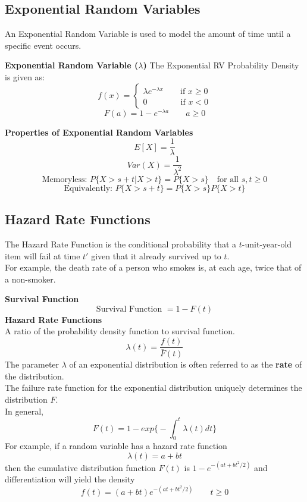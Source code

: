 \documentclass[10pt,a4paper]{article}
\begin{document}
     \subsection{Exponential Random Variables}
     An Exponential Random Variable is used to model the amount of time until a specific event occurs.
     \begin{framed}
     	\centering\textbf{Exponential Random Variable ($\lambda$)}
     	The Exponential RV Probability Density is given as:
     	$$f(x) = \begin{cases}
     	\lambda e^{-\lambda x} \qquad \text{if } x \geq 0 \\
     	0 \qquad \qquad \text{if } x < 0
     	\end{cases}$$
     	$$F(a) = 1 - e^{-\lambda a} \qquad a \geq 0 $$
     \end{framed}
     \newpage 
     \begin{framed}
     	\centering\textbf{Properties of Exponential Random Variables}
     	$$E[X] = \frac{1}{\lambda}$$
     	$$Var(X) = \frac{1}{\lambda^{2}}$$
     	$$\text{Memoryless: } P\{X > s + t | X > t\} = P\{X > s\} \quad \text{for all }s,t \geq 0$$ 
     	$$\text{Equivalently: } P\{X > s + t\} = P\{X > s\}P\{X > t\}$$
     \end{framed}
     \subsection{Hazard Rate Functions}
     The Hazard Rate Function is the conditional probability that a $t$-unit-year-old item will fail at time $t'$ given that it already survived up to $t$. \\
     For example, the death rate of a person who smokes is, at each age, twice that of a non-smoker.
     \begin{framed}
     \centering\textbf{Survival Function}
     $$\text{Survival Function } = 1-F(t)$$
     	\centering\textbf{Hazard Rate Functions} \\
     	A ratio of the probability density function to survival function.
     	$$\lambda (t) = \frac{f(t)}{\bar{F}(t)}$$
     	The parameter $\lambda$ of an exponential distribution is often referred to as the \textbf{rate }of the distribution.\\
     	The failure rate function for the exponential distribution uniquely determines the distribution $F$.\\
     	In general, $$F(t) = 1 - exp \bigg\{-\int_{0}^{t}\lambda(t) dt\bigg\}$$
     	For example, if a random variable has a hazard rate function $$\lambda (t) = a + bt$$ then the cumulative distribution function $F(t)$ is $1 - e^{-(at+bt^{2}/2)}$ and differentiation will yield the density $$f(t) = (a+bt)e^{-(at+bt^{2}/2)} \qquad t \geq 0$$
     \end{framed}
\end{document}
